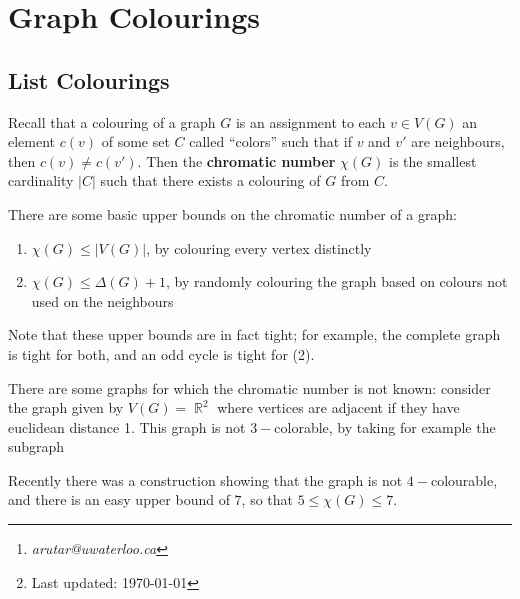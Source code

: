 \documentclass[11pt, a4paper]{memoir}
\title{\subject}
\author{Alex Rutar\thanks{\itshape arutar@uwaterloo.ca}\\ University of Waterloo}
\date{\semester\thanks{Last updated: \today}}
\DeclareMathOperator{\R}{{\mathbb{R}}}
\theoremstyle{change}
\theoremstyle{plain}
\theoremstyle{nonumberplain}
\numberwithin{equation}{section}
\begin{document}
\hypersetup{pageanchor=false}
\maketitle
\newpage
\frontmatter
\hypersetup{pageanchor=true}
\tableofcontents*
\newpage
\mainmatter


\chapter{Graph Colourings}
\section{List Colourings}
Recall that a colouring of a graph $G$ is an assignment to each $v\in V(G)$ an element $c(v)$ of some set $C$ called ``colors'' such that if $v$ and $v'$ are neighbours, then $c(v)\neq c(v')$.
Then the \textbf{chromatic number} $\chi(G)$ is the smallest cardinality $|C|$ such that there exists a colouring of $G$ from $C$.

There are some basic upper bounds on the chromatic number of a graph:
\begin{enumerate}[nl]
    \item $\chi(G)\leq|V(G)|$, by colouring every vertex distinctly
    \item $\chi(G)\leq\Delta(G)+1$, by randomly colouring the graph based on colours not used on the neighbours
\end{enumerate}
Note that these upper bounds are in fact tight; for example, the complete graph is tight for both, and an odd cycle is tight for (2).

There are some graphs for which the chromatic number is not known: consider the graph given by $V(G)=\R^2$ where vertices are adjacent if they have euclidean distance 1.
This graph is not $3-$colorable, by taking for example the subgraph
\begin{center}
\end{center}
Recently there was a construction showing that the graph is not $4-$colourable, and there is an easy upper bound of $7$, so that $5\leq \chi(G)\leq 7$.
\end{document}

